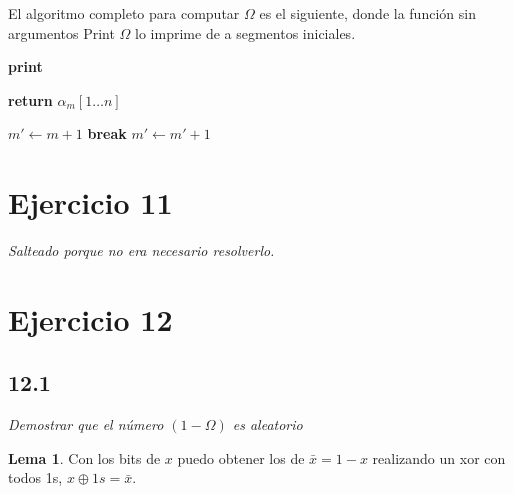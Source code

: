 \documentclass{article}
\theoremstyle{definition} %
\newtheorem{lemma}{Lema}
\newcommand{\firstn}[1]{\first{n}{#1}}
\newcommand{\first}[2]{#2[1 \dots #1]}
\begin{document}
El algoritmo completo para computar $\Omega$ es el siguiente, donde la función
sin argumentos Print $\Omega$ lo imprime de a segmentos iniciales.

\vspace{0.5cm}

\begin{algorithmic}

            \State \textbf{print} 
        \EndFor

    \EndFunction


            \State \textbf{return} $\firstn{\alpha_m}$
        \EndIf
    \EndFor

\EndFunction
        \State $m' \gets m + 1$
            \If{$\firstn{\alpha_m} \neq \firstn{\alpha_m'}$}
            \State \textbf{break}
            \EndIf
            \State $m' \gets m' + 1$
        \EndWhile
    \EndFunction
\end{algorithmic}

\section*{Ejercicio 11}

\textit{Salteado porque no era necesario resolverlo.}

\section*{Ejercicio 12}

\subsection*{12.1}

\textit{Demostrar que el número $(1 - \Omega)$ es aleatorio}

\begin{lemma}\label{lemma:xor-bits}
    Con los bits de $x$ puedo obtener los de $\bar{x} = 1 - x$ realizando un xor con
    todos 1s, $x \oplus 1s = \bar{x}$.
\end{lemma}
\end{document}
